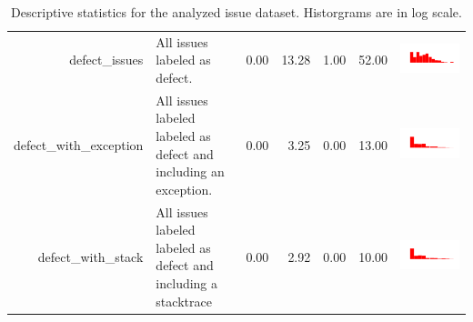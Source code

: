 \begin{table}[ht]
\begin{tabular}{rp{27em}rrrrc}
  defect\_issues & All issues labeled as defect. & 0.00 & 13.28 & 1.00 & 52.00 & \includegraphics[scale = 0.1, clip = true, trim= 50px 60px 50px 60px]{hist-eb1797e86ef23b2a07907e5ccbeff7b9.pdf} \\ 
  defect\_with\_exception & All issues labeled labeled as defect and including an exception. & 0.00 & 3.25 & 0.00 & 13.00 & \includegraphics[scale = 0.1, clip = true, trim= 50px 60px 50px 60px]{hist-f1a879616aa3e0995db35c6c02bc8520.pdf} \\ 
  defect\_with\_stack & All issues labeled labeled as defect and including a stacktrace & 0.00 & 2.92 & 0.00 & 10.00 & \includegraphics[scale = 0.1, clip = true, trim= 50px 60px 50px 60px]{hist-49dbfa02c366cab8b489f33014de587d.pdf} \\
 \hline
 \end{tabular}
\caption{Descriptive statistics for the analyzed issue dataset. Historgrams are in log scale.} 
\label{tab:stacktrace-stats}
\end{table}
